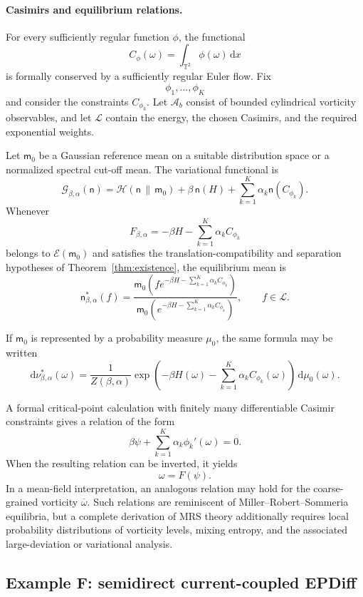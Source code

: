 \documentclass[11pt,reqno]{amsart}
\begin{document}
\paragraph{\bfseries Casimirs and equilibrium relations.}
For every sufficiently regular function $\phi$, the functional
\[
C_\phi(\omega)
=
\int_{\mathbb T^2}\phi(\omega)\,\mathrm dx
\]
is formally conserved by a sufficiently regular Euler flow. Fix
\[
\phi_1,\ldots,\phi_K
\]
and consider the constraints $C_{\phi_k}$. Let $\mathcal A_b$ consist
of bounded cylindrical vorticity observables, and let $\mathcal L$
contain the energy, the chosen Casimirs, and the required exponential
weights.

Let $\mathsf m_0$ be a Gaussian reference mean on a suitable
distribution space or a normalized spectral cut-off mean. The
variational functional is
\[
\mathcal G_{\beta,\alpha}(\mathsf n)
=
\mathcal H(\mathsf n\,\|\,\mathsf m_0)
+
\beta\,\mathsf n(H)
+
\sum_{k=1}^{K}
\alpha_k\mathsf n(C_{\phi_k}).
\]
Whenever
\[
F_{\beta,\alpha}
=
-\beta H-\sum_{k=1}^{K}\alpha_kC_{\phi_k}
\]
belongs to $\mathcal E(\mathsf m_0)$ and satisfies the
translation-compatibility and separation hypotheses of
Theorem~\ref{thm:existence}, the equilibrium mean is
\[
\boxed{
\mathsf n_{\beta,\alpha}^*(f)
=
\frac{
\mathsf m_0
\left(
f e^{-\beta H-\sum_{k=1}^{K}\alpha_kC_{\phi_k}}
\right)
}{
\mathsf m_0
\left(
e^{-\beta H-\sum_{k=1}^{K}\alpha_kC_{\phi_k}}
\right)
},
\qquad
f\in\mathcal L.
}
\]

If $\mathsf m_0$ is represented by a probability measure $\mu_0$, the
same formula may be written
\[
\mathrm d\nu_{\beta,\alpha}^*(\omega)
=
\frac{1}{Z(\beta,\alpha)}
\exp\left(
-\beta H(\omega)
-\sum_{k=1}^{K}\alpha_kC_{\phi_k}(\omega)
\right)
\,\mathrm d\mu_0(\omega).
\]

A formal critical-point calculation with finitely many differentiable
Casimir constraints gives a relation of the form
\[
\beta\psi
+
\sum_{k=1}^{K}\alpha_k\phi_k'(\omega)
=
0.
\]
When the resulting relation can be inverted, it yields
\[
\omega=F(\psi).
\]
In a mean-field interpretation, an analogous relation may hold for the
coarse-grained vorticity $\overline\omega$. Such relations are
reminiscent of Miller--Robert--Sommeria equilibria, but a complete
derivation of MRS theory additionally requires local probability
distributions of vorticity levels, mixing entropy, and the associated
large-deviation or variational analysis.

\subsection{Example F: semidirect current-coupled EPDiff}
\end{document}
